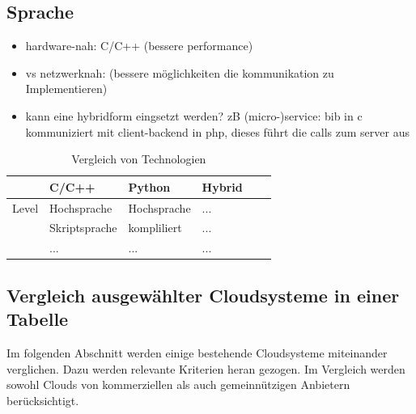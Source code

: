 \documentclass[a4paper,10pt]{article}
\numberwithin{figure}{section}
\numberwithin{table}{section}
\begin{document}
\cite{ArchitectingTheCloud}

\subsection{Sprache}

\begin{itemize}
 \item hardware-nah: C/C++ (bessere performance)
 \item vs netzwerknah: (bessere möglichkeiten die kommunikation zu Implementieren)
 \item kann eine hybridform eingsetzt werden?
 zB (micro-)service: bib in c kommuniziert mit client-backend in php, dieses führt die calls zum server aus
\end{itemize}

\begin{table}[H]
\centering
\caption{Vergleich von Technologien}
\label{my-label}
\renewcommand{\arraystretch}{1.5}
\begin{tabular}{llllll}
\hline
 & C/C++ & Python & Hybrid\\
\hline
Level & Hochsprache & Hochsprache & ...\\
 & Skriptsprache & kompliliert & ...\\
 & ... & ... & ...\\
\hline
\end{tabular}
\end{table}

\subsection{Vergleich ausgewählter Cloudsysteme in einer Tabelle}

Im folgenden Abschnitt werden einige bestehende Cloudsysteme miteinander verglichen.
Dazu werden relevante Kriterien heran gezogen.
Im Vergleich werden sowohl Clouds von kommerziellen als auch gemeinnützigen Anbietern berücksichtigt.
\end{document}
